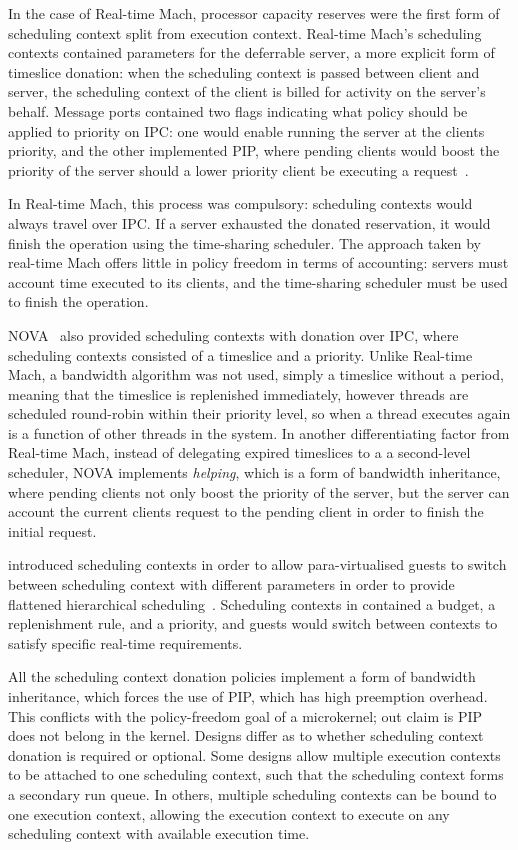 In the case of Real-time Mach, processor capacity reserves were the first form of scheduling context
split from execution context. Real-time Mach's scheduling contexts contained parameters for the deferrable
server, a more explicit form of
timeslice donation: when the scheduling context is passed between client and server, the scheduling
context of the client is billed for activity on the server's behalf. 
Message ports contained two flags indicating what policy should be applied to priority on \gls{IPC}:
one would enable running the server at the clients priority, and the other implemented \gls{PIP},
where pending clients would boost the priority of the server should a lower priority client be
executing a request~\citep{Kitayama_NT_93}. 

In Real-time Mach, this process was
compulsory: scheduling contexts would always travel over \gls{IPC}.
If a server exhausted the
donated reservation, it would finish the operation using the time-sharing scheduler.  
The approach taken by real-time Mach offers little in policy freedom in terms of accounting: 
servers must account time executed to its clients, and the time-sharing scheduler must be used to
finish the operation.

NOVA~\citep{Steinberg_WH_05} also provided scheduling contexts with donation over \gls{IPC}, 
where scheduling contexts consisted of a timeslice and a priority. Unlike Real-time Mach, a
bandwidth algorithm was not used, simply a timeslice without a period, meaning that the timeslice is
replenished immediately, however threads are scheduled round-robin within their priority level, so
when a thread executes again is a function of other threads in the system.
In another differentiating factor from Real-time Mach, instead of delegating expired timeslices to a 
a second-level scheduler, NOVA implements \emph{helping}, which is a form of bandwidth inheritance, where pending clients not only boost the priority of the server, but the server can account the current clients 
request to the pending client in order to finish the initial request. 

\fiascooc introduced scheduling contexts in order to allow para-virtualised guests to switch between
scheduling context with different parameters in order to provide flattened hierarchical
scheduling~\citep{Lackorzynski_WVH_12}. Scheduling contexts in \fiascooc contained a budget, a
replenishment rule, and a priority, and guests would switch between contexts to satisfy specific
real-time requirements. 


All the scheduling context donation policies implement a form of bandwidth inheritance, which
forces the use of \gls{PIP}, which has high preemption overhead. This conflicts with the
policy-freedom goal of a microkernel; out claim is \gls{PIP} does not belong in the kernel. 
Designs differ as to whether
scheduling context donation is required or optional.  Some designs allow multiple execution contexts
to be attached to one scheduling context, such that the scheduling context forms a secondary run
queue.  In others, multiple scheduling contexts can be bound to one execution context, allowing the
execution context to execute on any scheduling context with available execution time. 


